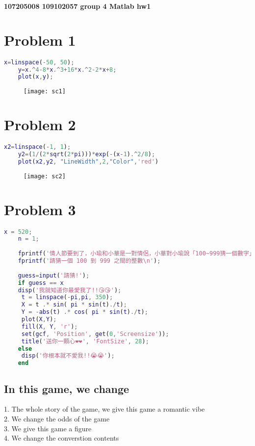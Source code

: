 \documentclass[UTF8]{ctexart}
\date{today}
\begin{document}
\textbf{107205008 109102057 group 4 Matlab hw1}
		\section*{Problem 1}
\begin{lstlisting}[language= matlab ]
	x=linspace(-50, 50);
	y=x.^4-8*x.^3+16*x.^2-2*x+8;
	plot(x,y);
		\end{lstlisting}
	\begin{figure}[H]
	\centering
	\texttt{[image: sc1]}
	\end{figure}
		\section*{Problem 2}
\begin{lstlisting}[language = matlab]
	x2=linspace(-1, 1);
	y2=(1/(2*sqrt(2*pi)))*exp(-(x-1).^2/8);
	plot(x2,y2, "LineWidth",2,"Color",'red')
\end{lstlisting}
	\begin{figure}[H]
	\centering
	\texttt{[image: sc2]}
	\end{figure}
		\section*{Problem 3}
\begin{lstlisting}[language = matlab]
	x = 520; 
	n = 1; 
	
	fprintf('情人節要到了，小瑜和小華是一對情侶，小華對小瑜說「100~999猜一個數字」\n');
	fprintf('請猜一個 100 到 999 之間的整數\n');
	
	guess=input('請猜!');
	if guess == x
	disp('我就知道你最愛我了!!😘😘');
	 t = linspace(-pi,pi, 350);
	 X = t .* sin( pi * sin(t)./t);
	 Y = -abs(t) .* cos( pi * sin(t)./t);
	 plot(X,Y);
	 fill(X, Y, 'r');
	 set(gcf, 'Position', get(0,'Screensize'));
	 title('送你一顆心❤️❤️', 'FontSize', 28);
	else
	 disp('你根本就不愛我!!😭😭');
	end
\end{lstlisting}
		\subsection*{In this game, we change}
		1. The whole story of the game, we give this game a romantic vibe\\
		\hspace*{7.2mm}2. We change the odds of the game\\
		\hspace*{7.2mm}3. We give this game a figure\\
		\hspace*{7.2mm}4. We change the converstion contents\\
\end{document}
